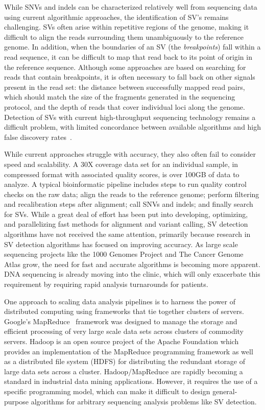 While SNVs and indels can be characterized relatively well from sequencing data using current algorithmic approaches, the identification of SV's remains challenging. SVs often arise within repetitive regions of the genome, making it difficult to align the reads surrounding them unambiguously to the reference genome. In addition, when the boundaries of an SV (the \emph{breakpoints}) fall within a read sequence, it can be difficult to map that read back to its point of origin in the reference sequence. Although some approaches are based on searching for reads that contain breakpoints, it is often necessary to fall back on other signals present in the read set: the distance between successfully mapped read pairs, which should match the size of the fragments generated in the sequencing protocol, and the depth of reads that cover individual loci along the genome. Detection of SVs with current high-throughput sequencing technology remains a difficult problem, with limited concordance between available algorithms and high false discovery rates~\cite{Mills:2011p1611}.

While current approaches struggle with accuracy, they also often fail to consider speed and scalability. A 30X coverage data set for an individual sample, in compressed format with associated quality scores, is over 100GB of data to analyze. A typical bioinformatic pipeline includes steps to run quality control checks on the raw data; align the reads to the reference genome; perform filtering and recalibration steps after alignment; call SNVs and indels; and finally search for SVs. While a great deal of effort has been put into developing, optimizing, and parallelizing fast methods for alignment and variant calling, SV detection algorithms have not received the same attention, primarily because research in SV detection algorithms has focused on improving accuracy. As large scale sequencing projects like the 1000 Genomes Project and The Cancer Genome Atlas grow, the need for fast and accurate algorithms is becoming more apparent. DNA sequencing is already moving into the clinic, which will only exacerbate this requirement by requiring rapid analysis turnarounds for patients.

One approach to scaling data analysis pipelines is to harness the power of distributed computing using frameworks that tie together clusters of servers. Google's MapReduce~\cite{Dean:2008p277} framework was designed to manage the storage and efficient processing of very large scale data sets across clusters of commodity servers. Hadoop is an open source project of the Apache Foundation which provides an implementation of the MapReduce programming framework as well as a distributed file system (HDFS) for distributing the redundant storage of large data sets across a cluster. Hadoop/MapReduce are rapidly becoming a standard in industrial data mining applications. However, it requires the use of a specific programming model, which can make it difficult to design general-purpose algorithms for arbitrary sequencing analysis problems like SV detection. 

